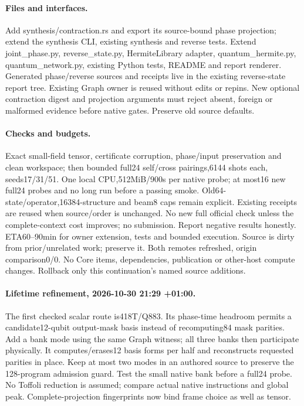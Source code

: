 \documentclass{article}
\begin{document}
\paragraph{Files and interfaces.} Add synthesis/contraction.rs and export its
source-bound phase projection; extend the synthesis CLI, existing synthesis and
reverse tests. Extend joint\_phase.py, reverse\_state.py, HermiteLibrary adapter,
quantum\_hermite.py, quantum\_network.py, existing Python tests, README and report
renderer. Generated phase/reverse sources and receipts live in the existing
reverse-state report tree. Existing Graph owner is reused without edits or repins.
New optional contraction digest and projection arguments must reject absent,
foreign or malformed evidence before native gates. Preserve old source defaults.
\paragraph{Checks and budgets.} Exact small-field tensor, certificate corruption,
phase/input preservation and clean workspace; then bounded full24 self/cross
pairings,6144 shots each, seeds17/31/51. One local CPU,512MiB/900s per native
probe; at most16 new full24 probes and no long run before a passing smoke.
Old64-state/operator,16384-structure and beam8 caps remain explicit. Existing
receipts are reused when source/order is unchanged. No new full official check
unless the complete-context cost improves; no submission. Report negative
results honestly. ETA60--90min for owner extension, tests and bounded execution.
Source is dirty from prior/unrelated work; preserve it. Both remotes refreshed,
origin comparison0/0. No Core items, dependencies, publication or other-host
compute changes. Rollback only this continuation's named source additions.
\paragraph{Lifetime refinement, 2026-10-30 21:29 +01:00.}
The first checked scalar route is418T/Q883. Its phase-time headroom permits a
candidate12-qubit output-mask basis instead of recomputing84 mask parities.
Add a bank mode using the same Graph witness; all three banks then participate
physically. It computes/erases12 basis forms per half and reconstructs requested
parities in place. Keep at most two modes in an authored source to preserve the
128-program admission guard. Test the small native bank before a full24 probe.
No Toffoli reduction is assumed; compare actual native instructions and global
peak. Complete-projection fingerprints now bind frame choice as well as tensor.
\begin{center}\end{center}
\end{document}
